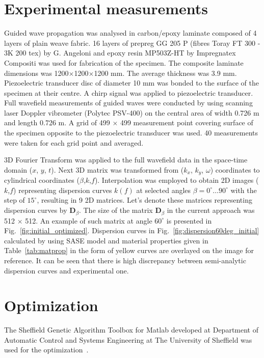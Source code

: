 \documentclass[preprint,12pt]{elsarticle}
\newcommand{\matr}[1]{\mathbf{#1}} %
\begin{document}
\section{Experimental measurements \label{sec:experiment}}
Guided wave propagation was analysed in carbon/epoxy laminate composed of 4 layers of plain weave fabric. 16 layers of prepreg GG 205  P (fibres Toray FT 300 - 3K 200 tex) by G. Angeloni and epoxy resin MP503Z-HT by Impregnatex Compositi was used for fabrication of the specimen. The composite laminate dimensions was 1200$\times$1200$\times$1200 mm. The average thickness was 3.9 mm. 
Piezoelectric transducer disc of diameter 10 mm was bonded to the surface of the specimen at their centre. A chirp signal was applied to piezoelectric transducer. Full wavefield measurements of guided waves were conducted by using scanning laser Doppler vibrometer (Polytec PSV-400) on the central area of width 0.726 m and length 0.726 m. A grid of 499 $\times$ 499 measurement point covering surface of the specimen opposite to the piezoelectric transducer was used. 40 measurements were taken for each grid point and averaged.

3D Fourier Transform was applied to the full wavefield data in the space-time domain ($x$, $y$, $t$). Next 3D matrix was transformed from ($k_x$, $k_y$, $\omega$) coordinates to cylindrical coordinates ($\beta$,$k$,$f$). Interpolation was employed to obtain 2D images ($k$,$f$) representing dispersion curves $k(f)$ at selected angles $\beta = 0^{\circ} \ldots 90^{\circ}$ with the step of $15^{\circ}$, resulting in 9 2D matrices. Let's denote these matrices representing dispersion curves by $\matr{D}_{\beta}$. The size of the matrix  $\matr{D}_{\beta}$ in the current approach was 512 $\times$ 512.  An example of such matrix at angle $ 60^{\circ}$ is presented in Fig.~\ref{fig:initial_optimized}. Dispersion curves in Fig.~\ref{fig:dispersion60deg_initial} calculated by using SASE model and material properties given in Table~\ref{tab:matprop} in the form of yellow curves are overlayed on the image for reference. It can be seen that there is high discrepancy between semi-analytic dispersion curves and experimental one. 

	\section{Optimization \label{sec:optimization}}
	The Sheffield Genetic Algorithm Toolbox for Matlab developed at Department of Automatic Control and Systems Engineering at The University of Sheffield was used for the optimization~\cite{Chipperfield1994}.
\end{document}
